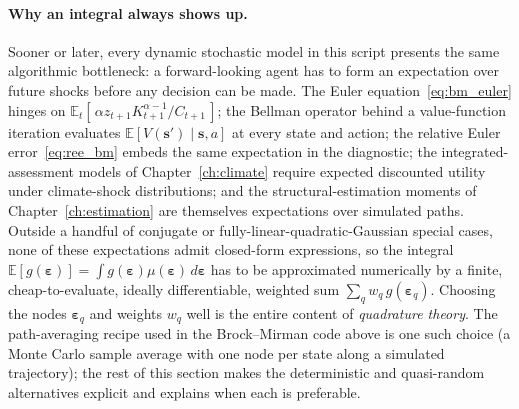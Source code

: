 \documentclass[11pt,a4paper]{report}
\begin{document}
\paragraph{Why an integral always shows up.}  Sooner or later, every dynamic stochastic model in this script presents the same algorithmic bottleneck: a forward-looking agent has to form an expectation over future shocks before any decision can be made.  The Euler equation~\eqref{eq:bm_euler} hinges on $\mathbb{E}_t[\,\alpha z_{t+1} K_{t+1}^{\alpha-1}/C_{t+1}\,]$; the Bellman operator behind a value-function iteration evaluates $\mathbb{E}[V(\bm{s}')\mid\bm{s},a]$ at every state and action; the relative Euler error~\eqref{eq:ree_bm} embeds the same expectation in the diagnostic; the integrated-assessment models of Chapter~\ref{ch:climate} require expected discounted utility under climate-shock distributions; and the structural-estimation moments of Chapter~\ref{ch:estimation} are themselves expectations over simulated paths.  Outside a handful of conjugate or fully-linear-quadratic-Gaussian special cases, none of these expectations admit closed-form expressions, so the integral $\mathbb{E}[g(\bm\varepsilon)] = \int g(\bm\varepsilon)\mu(\bm\varepsilon)\,d\bm\varepsilon$ has to be approximated numerically by a finite, cheap-to-evaluate, ideally differentiable, weighted sum $\sum_q w_q\, g(\bm\varepsilon_q)$.  Choosing the nodes $\bm\varepsilon_q$ and weights $w_q$ well is the entire content of \emph{quadrature theory}.  The path-averaging recipe used in the Brock--Mirman code above is one such choice (a Monte Carlo sample average with one node per state along a simulated trajectory); the rest of this section makes the deterministic and quasi-random alternatives explicit and explains when each is preferable.
\end{document}
